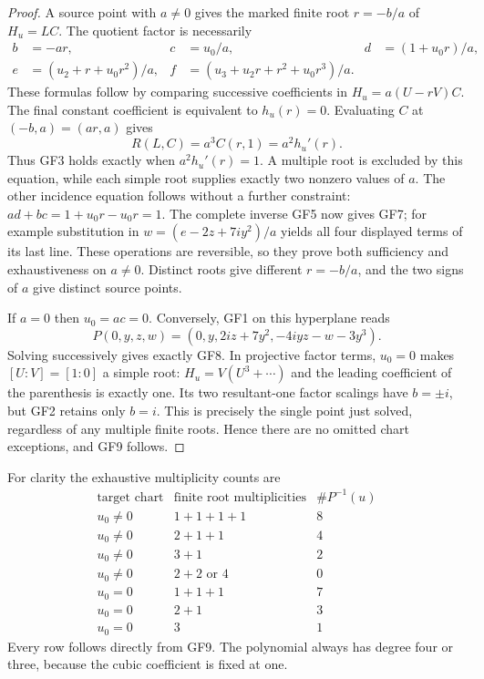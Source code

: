 \begin{proof}
A source point with $a\ne0$ gives the marked finite root
$r=-b/a$ of $H_u=LC$. The quotient factor is necessarily
\begin{align*}
 b&=-ar,&c&=u_0/a,&d&=(1+u_0r)/a,\\
 e&=(u_2+r+u_0r^2)/a,&
 f&=(u_3+u_2r+r^2+u_0r^3)/a.
\end{align*}
These formulas follow by comparing successive coefficients in
$H_u=a(U-rV)C$. The final constant coefficient is equivalent to
$h_u(r)=0$. Evaluating $C$ at $(-b,a)=(ar,a)$ gives
\[
 R(L,C)=a^3 C(r,1)=a^2 h_u'(r).
\]
Thus GF3 holds exactly when $a^2h_u'(r)=1$. A multiple root is
excluded by this equation, while each simple root supplies exactly
two nonzero values of $a$. The other incidence equation follows
without a further constraint:
$ad+bc=1+u_0r-u_0r=1$. The complete inverse GF5 now gives GF7;
for example substitution in $w=(e-2z+7iy^2)/a$ yields all four
displayed terms of its last line. These operations are reversible,
so they prove both sufficiency and exhaustiveness on $a\ne0$.
Distinct roots give different $r=-b/a$, and the two signs of $a$
give distinct source points.

If $a=0$ then $u_0=ac=0$. Conversely, GF1 on this hyperplane reads
\[
 P(0,y,z,w)=(0,y,2iz+7y^2,-4iyz-w-3y^3).
\]
Solving successively gives exactly GF8. In projective factor terms,
$u_0=0$ makes $[U:V]=[1:0]$ a simple root: $H_u=V(U^3+\cdots)$
and the leading coefficient of the parenthesis is exactly one.
Its two resultant-one factor scalings have $b=\pm i$, but GF2
retains only $b=i$. This is precisely the single point just solved,
regardless of any multiple finite roots. Hence there are no omitted
chart exceptions, and GF9 follows.
\end{proof}

For clarity the exhaustive multiplicity counts are
\[
\begin{array}{c|c|c}
\text{target chart}&\text{finite root multiplicities}&\#P^{-1}(u)\\\hline
u_0\ne0&1+1+1+1&8\\
u_0\ne0&2+1+1&4\\
u_0\ne0&3+1&2\\
u_0\ne0&2+2\text{ or }4&0\\\hline
u_0=0&1+1+1&7\\
u_0=0&2+1&3\\
u_0=0&3&1
\end{array}
\]
Every row follows directly from GF9. The polynomial always has
degree four or three, because the cubic coefficient is fixed at one.

